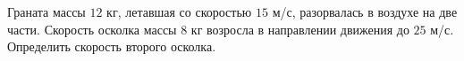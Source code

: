 Граната массы $12$ кг, летавшая со скоростью $15$ м/с, разорвалась в воздухе на две части. 
Скорость осколка массы $8$ кг возросла в направлении движения до $25$ м/с. 
Определить скорость второго осколка.
